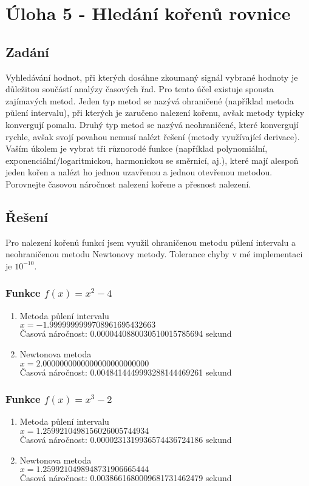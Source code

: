 \documentclass[a4paper,12pt]{article}
\begin{document}
	\section {Úloha 5 - Hledání kořenů rovnice}
	\subsection{Zadání}
Vyhledávání hodnot, při kterých dosáhne zkoumaný signál vybrané hodnoty je důležitou součástí analýzy časových řad. Pro tento účel existuje spousta zajímavých metod. Jeden typ metod se nazývá ohraničené (například metoda půlení intervalu), při kterých je zaručeno nalezení kořenu, avšak metody typicky konvergují pomalu. Druhý typ metod se nazývá neohraničené, které konvergují rychle, avšak svojí povahou nemusí nalézt řešení (metody využívající derivace). Vaším úkolem je vybrat tři různorodé funkce (například polynomiální, exponenciální/logaritmickou, harmonickou se směrnicí, aj.), které mají alespoň jeden kořen a nalézt ho jednou uzavřenou a jednou otevřenou metodou. Porovnejte časovou náročnost nalezení kořene a přesnost nalezení.

\subsection{Řešení}
Pro nalezení kořenů funkcí jsem využil ohraničenou metodu půlení intervalu a neohraničenou metodu Newtonovy metody. Tolerance chyby v mé implementaci je $10^{-10}$.
	\subsubsection{Funkce $f(x)=x^{2}-4$}
		\begin{enumerate}
			\item Metoda půlení intervalu\\$x=-1.9999999999708961695432663$\\Časová náročnost: 0.0000440880030510015785694 sekund
			\item Newtonova metoda\\$x=2.0000000000000000000000000$\\Časová náročnost: 0.0048414449993288144469261 sekund	\end{enumerate}
	\subsubsection{Funkce $f(x)=x^{3}-2$}
		\begin{enumerate}
			\item Metoda půlení intervalu\\$x=1.2599210498156026005744934$\\Časová náročnost: 0.0000231319936574436724186 sekund
			\item Newtonova metoda\\$x=1.2599210498948731906665444$\\Časová náročnost: 0.0038661680009681731462479 sekund	\end{enumerate}
\end{document}
